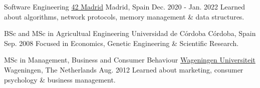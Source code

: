 
\begin{cventries}

  \cventry
    {Software Engineering} %
    {\href{https://42.fr/en/homepage/}{42 Madrid}} %
    {Madrid, Spain} %
    {Dec. 2020 - Jan. 2022} %
    {
      {Learned about algorithms, network protocols, memory management \& data structures.}
    }

  \cventry
    {BSc and MSc in Agricultual Engineering} %
    {Universidad de Córdoba} %
    {Córdoba, Spain} %
    {Sep. 2008} %
    {
      {Focused in Economics, Genetic Engineering \& Scientific Research.}
    }

  \cventry
    {MSc in Management, Business and Consumer Behaviour} %
    {\href{https://www.wur.nl/en.htm}{Wageningen Universiteit}} %
    {Wageningen, The Netherlands} %
    {Aug. 2012} %
    {
      {Learned about marketing, consumer psychology \& business management.}
    }


\end{cventries}
